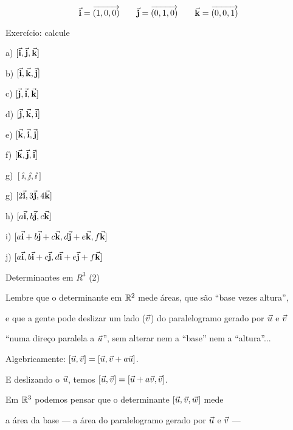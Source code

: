 \documentclass[oneside]{book}
\begin{document}
$$\ii=\V(1,0,0) \qquad \jj=\V(0,1,0) \qquad \kk=\V(0,0,1)$$

Exercício: calcule

a) $[\ii,\jj,\kk]$

b) $[\ii,\kk,\jj]$

c) $[\jj,\ii,\kk]$

d) $[\jj,\kk,\ii]$

e) $[\kk,\ii,\jj]$

f) $[\kk,\jj,\ii]$

g) $[\ii,\jj,\ii]$

g) $[2\ii,3\jj,4\kk]$

h) $[a\ii,b\jj,c\kk]$

i) $[a\ii+b\jj+c\kk,d\jj+e\kk,f\kk]$

j) $[a\ii, b\ii+c\jj, d\ii+e\jj+f\kk]$




\newpage


 {Determinantes em $R^3$ (2)}

\ssk

Lembre que o determinante em $\R^2$ mede áreas, que são ``base vezes altura'',

e que a gente pode deslizar um lado ($\vv$) do paralelogramo gerado por $\uu$ e $\vv$

``numa direço paralela a $\uu$'', sem alterar nem a ``base'' nem a ``altura''...

Algebricamente: $[\uu,\vv] = [\uu,\vv+a\uu]$.

E deslizando o $\uu$, temos $[\uu,\vv] = [\uu+a\vv,\vv]$.

\msk

Em $\R^3$ podemos pensar que o determinante $[\uu,\vv,\ww]$ mede

a área da base --- a área do paralelogramo gerado por $\uu$ e $\vv$ ---
\end{document}
